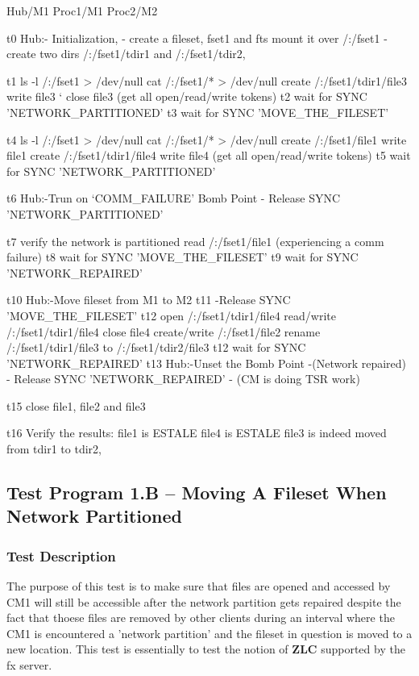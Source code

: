 \begin{programexample}
    Hub/M1		Proc1/M1			Proc2/M2
	 	 
t0  Hub:- Initialization,
	- create a fileset, fset1 and fts mount it over /:/fset1
	- create two dirs /:/fset1/tdir1 and /:/fset1/tdir2, 

t1							ls -l /:/fset1  > /dev/null
							cat /:/fset1/* > /dev/null
							create /:/fset1/tdir1/file3
							write file3
	`						close file3
							(get all open/read/write tokens)
t2							wait for SYNC 'NETWORK_PARTITIONED'
t3							wait for SYNC 'MOVE_THE_FILESET'

t4			ls -l /:/fset1 > /dev/null 				
			cat /:/fset1/* > /dev/null
			create /:/fset1/file1
			write file1
			create /:/fset1/tdir1/file4
			write file4
			(get all open/read/write tokens)
t5			wait for SYNC 'NETWORK_PARTITIONED'

t6  Hub:-Trun on `COMM_FAILURE' Bomb Point
	- Release SYNC 'NETWORK_PARTITIONED'

t7			verify the network is partitioned
			read /:/fset1/file1 
			(experiencing a comm failure)
t8			wait for SYNC 'MOVE_THE_FILESET'
t9			wait for SYNC 'NETWORK_REPAIRED'
		
t10 Hub:-Move fileset from M1 to M2
t11	-Release SYNC 'MOVE_THE_FILESET'
t12							open  /:/fset1/tdir1/file4
							read/write /:/fset1/tdir1/file4
							close file4
							create/write /:/fset1/file2
							rename /:/fset1/tdir1/file3 to 
							       /:/fset1/tdir2/file3
t12							wait for SYNC 'NETWORK_REPAIRED'
t13 Hub:-Unset the Bomb Point 
	-(Network repaired)
	- Release SYNC 'NETWORK_REPAIRED'
	- (CM is doing TSR work)

t15							close file1, file2 and file3

t16			Verify the results:
			file1 is ESTALE
			file4 is ESTALE
			file3 is indeed moved from tdir1 to tdir2,	


\end{programexample}

\pagebreak 
\subsection {Test Program 1.B -- Moving A Fileset When Network Partitioned}

\subsubsection {Test Description}

The purpose of this test is to make sure that files are opened and accessed
by CM1 will still be accessible after the network partition gets repaired despite the
fact that thoese files are removed by other clients during an interval where the CM1 is
encountered a 'network partition' and the fileset in question is moved to a new location.
This test is essentially to test the notion of {\bf ZLC} supported by the fx server.

